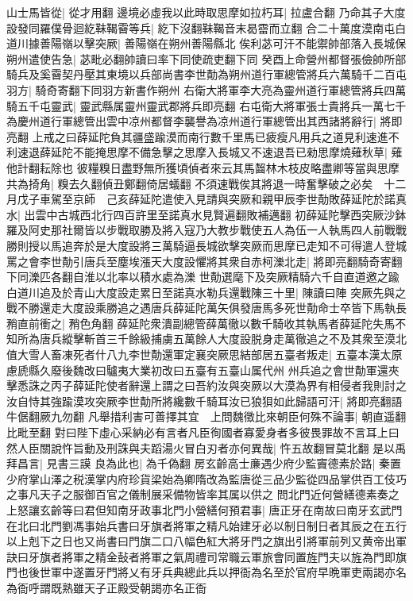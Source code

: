 山士馬皆從|{
	從才用翻}
邊境必虛我以此時取思摩如拉朽耳|{
	拉盧合翻}
乃命其子大度設發同羅僕骨迴紇靺鞨霫等兵|{
	紇下沒翻靺鞨音末曷霤而立翻}
合二十萬度漠南屯白道川據善陽嶺以擊突厥|{
	善陽嶺在朔州善陽縣北}
俟利苾可汗不能禦帥部落入長城保朔州遣使告急|{
	苾毗必翻帥讀曰率下同使疏吏翻下同}
癸酉上命營州都督張儉帥所部騎兵及奚霫契丹壓其東境以兵部尚書李世勣為朔州道行軍總管將兵六萬騎千二百屯羽方|{
	騎奇寄翻下同羽方新書作朔州}
右衛大將軍李大亮為靈州道行軍總管將兵四萬騎五千屯靈武|{
	靈武縣属靈州靈武郡將兵即亮翻}
右屯衛大將軍張士貴將兵一萬七千為慶州道行軍總管出雲中凉州都督李襲譽為凉州道行軍總管出其西諸將辭行|{
	將即亮翻}
上戒之曰薛延陀負其疆盛踰漠而南行數千里馬已疲瘦凡用兵之道見利速進不利速退薛延陀不能掩思摩不備急擊之思摩入長城又不速退吾已勑思摩燒薙秋草|{
	薙他計翻耘除也}
彼糧糗日盡野無所獲頃偵者來云其馬齧林木枝皮略盡卿等當與思摩共為掎角|{
	糗去久翻偵丑鄭翻倚居蟻翻}
不須速戰俟其將退一時奮擊破之必矣　十二月戊子車駕至京師　己亥薛延陀遣使入見請與突厥和親甲辰李世勣敗薛延陀於諾真水|{
	出雲中古城西北行四百許里至諾真水見賢遍翻敗補邁翻}
初薛延陀擊西突厥沙鉢羅及阿史那社爾皆以步戰取勝及將入寇乃大教步戰使五人為伍一人執馬四人前戰戰勝則授以馬追奔於是大度設將三萬騎逼長城欲擊突厥而思摩已走知不可得遣人登城罵之會李世勣引唐兵至塵埃漲天大度設懼將其衆自赤柯濼北走|{
	將即亮翻騎奇寄翻下同濼匹各翻自淮以北率以積水處為濼}
世勣選麾下及突厥精騎六千自直道邀之踰白道川追及於青山大度設走累日至諾真水勒兵還戰陳三十里|{
	陳讀曰陣}
突厥先與之戰不勝還走大度設乘勝追之遇唐兵薛延陀萬矢俱發唐馬多死世勣命士卒皆下馬執長矟直前衝之|{
	矟色角翻}
薛延陀衆潰副總管薛萬徹以數千騎收其執馬者薛延陀失馬不知所為唐兵縱擊斬首三千餘級捕虜五萬餘人大度設脱身走萬徹追之不及其衆至漠北值大雪人畜凍死者什八九李世勣還軍定襄突厥思結部居五臺者叛走|{
	五臺本漢太原慮虒縣久廢後魏改曰驢夷大業初改曰五臺有五臺山属代州}
州兵追之會世勣軍還夾擊悉誅之丙子薛延陀使者辭還上謂之曰吾約汝與突厥以大漠為界有相侵者我則討之汝自恃其強踰漠攻突厥李世勣所將纔數千騎耳汝已狼狽如此歸語可汗|{
	將即亮翻語牛倨翻厥九勿翻}
凡舉措利害可善擇其宜　上問魏徵比來朝臣何殊不論事|{
	朝直遥翻比毗至翻}
對曰陛下虛心采納必有言者凡臣徇國者寡愛身者多彼畏罪故不言耳上曰然人臣關說忤旨動及刑誅與夫蹈湯火冒白刃者亦何異哉|{
	忤五故翻冒莫北翻}
是以禹拜昌言|{
	見書三謨}
良為此也|{
	為千偽翻}
房玄齡高士亷遇少府少監竇德素於路|{
	秦置少府掌山澤之税漢掌内府珍貨梁始為卿隋改為監唐從三品少監從四品掌供百工伎巧之事凡天子之服御百官之儀制展采備物皆率其属以供之}
問北門近何營繕德素奏之上怒讓玄齡等曰君但知南牙政事北門小營繕何預君事|{
	唐正牙在南故曰南牙玄武門在北曰北門劉馮事始兵書曰牙旗者將軍之精凡始建牙必以制日制日者其辰之在五行以上剋下之日也又尚書曰門旗二口八幅色紅大將牙門之旗出引將軍前列又黄帝出軍訣曰牙旗者將軍之精金鼔者將軍之氣周禮司常職云軍旅會同置旌門夫以旌為門即旗門也後世軍中遂置牙門將乂有牙兵典總此兵以押衙為名至於官府早晩軍吏兩謁亦名為衙呼謂既熟雖天子正殿受朝謁亦名正衙}
